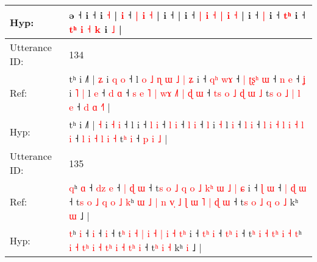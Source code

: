 \documentclass[10pt]{article}
\DeclareRobustCommand{\hl}[1]{{\textcolor{red}{#1}}}
\begin{document}
\begin{longtable}{ll}
Hyp: & ə ˧\hl{}\hl{} i ˧\hl{}\hl{}\hl{}\hl{}\hl{}\hl{}\hl{}\hl{} i\hl{}\hl{}\hl{}\hl{}\hl{}\hl{}\hl{} \hl{˧} |\hl{}\hl{} \hl{}\hl{i} ˧\hl{}\hl{}\hl{}\hl{}\hl{}\hl{}\hl{}\hl{}\hl{}\hl{}\hl{}\hl{}\hl{} \hl{}\hl{|} \hl{i} \hl{˧} |\hl{}\hl{} i ˧ |\hl{}\hl{} i ˧ \hl{|} \hl{}\hl{i} \hl{˧} \hl{|} \hl{i} \hl{˧} |\hl{}\hl{} i ˧ \hl{|} i ˧ \hl{}\hl{t}\hl{ʰ} i ˧ \hl{}\hl{t}\hl{ʰ} \hl{i} \hl{˧} \hl{k} i \hl{˩} |
 \\
\midrule
Utterance ID: & 134 \\
Ref: & tʰ i ˩˥ | \hl{ʑ} i \hl{q} \hl{o} ˧ l\hl{ }\hl{o}\hl{ }\hl{˩}\hl{ }\hl{ɳ}\hl{ }\hl{ɯ}\hl{ }\hl{˩}\hl{ }\hl{|}\hl{ }\hl{ʑ} i ˧ \hl{q}\hl{ʰ} \hl{w}\hl{ɤ} ˧\hl{ }\hl{|} \hl{ʈ}\hl{ʂ}\hl{ʰ} \hl{ɯ} ˧ \hl{n} \hl{e} ˧ \hl{ʝ} i\hl{ }\hl{˥} \hl{|} l \hl{e} ˧ \hl{d} \hl{ɑ} ˧\hl{ }\hl{s} \hl{e} \hl{˥} \hl{|} \hl{w}\hl{ɤ} \hl{˩}\hl{˥} \hl{|} \hl{ɖ} \hl{ɯ} ˧ \hl{t}\hl{s} \hl{o} \hl{˩} \hl{ɖ} \hl{ɯ} \hl{˩} t\hl{s}\hl{ }\hl{o}\hl{ }\hl{˩}\hl{ }\hl{|}\hl{ }\hl{l} \hl{e} ˧ \hl{d} \hl{ɑ} \hl{˧}\hl{˥} |
 \\
Hyp: & tʰ i ˩˥ | \hl{˧} i \hl{˧} \hl{i} ˧ l\hl{}\hl{}\hl{}\hl{}\hl{}\hl{}\hl{}\hl{}\hl{}\hl{}\hl{}\hl{}\hl{}\hl{} i ˧ \hl{}\hl{l} \hl{}\hl{i} ˧\hl{}\hl{} \hl{}\hl{}\hl{l} \hl{i} ˧ \hl{l} \hl{i} ˧ \hl{l} i\hl{}\hl{} \hl{˧} l \hl{i} ˧ \hl{l} \hl{i} ˧\hl{}\hl{} \hl{l} \hl{i} \hl{˧} \hl{}\hl{l} \hl{}\hl{i} \hl{˧} \hl{l} \hl{i} ˧ \hl{}\hl{l} \hl{i} \hl{˧} \hl{l} \hl{i} \hl{˧} t\hl{}\hl{}\hl{}\hl{}\hl{}\hl{}\hl{}\hl{}\hl{ʰ} \hl{i} ˧ \hl{p} \hl{i} \hl{}\hl{˩} |
 \\
\midrule
Utterance ID: & 135 \\
Ref: & \hl{q}ʰ \hl{ɑ} ˧\hl{ }\hl{d}\hl{z} \hl{e} ˧\hl{ }\hl{|}\hl{ }\hl{ɖ} \hl{ɯ} ˧ t\hl{s} \hl{o} \hl{˩} \hl{q} \hl{o} \hl{˩} \hl{k}\hl{ʰ} \hl{ɯ} \hl{˩} \hl{|}\hl{ }\hl{ɕ} i ˧ \hl{}\hl{ɭ} \hl{ɯ} ˧ \hl{|}\hl{ }\hl{ɖ} \hl{ɯ} ˧ t\hl{s} \hl{o} \hl{˩} \hl{}\hl{q} \hl{o} \hl{˩} \hl{k}ʰ \hl{ɯ} \hl{˩} \hl{}\hl{|} \hl{n} \hl{v}\hl{̩} \hl{˩}\hl{ }\hl{ɭ} \hl{ɯ} \hl{˥} \hl{|}\hl{ }\hl{ɖ} \hl{ɯ} ˧ t\hl{s}\hl{ }\hl{o}\hl{ }\hl{˩}\hl{ }\hl{q} \hl{o} \hl{˩} kʰ \hl{ɯ} ˩ |
 \\
Hyp: & \hl{t}ʰ \hl{i} ˧\hl{}\hl{}\hl{} \hl{i} ˧\hl{}\hl{}\hl{}\hl{} \hl{i} ˧ t\hl{ʰ} \hl{i} \hl{˧} \hl{|} \hl{i} \hl{˧} \hl{}\hl{|} \hl{i} \hl{˧} \hl{}\hl{t}\hl{ʰ} i ˧ \hl{t}\hl{ʰ} \hl{i} ˧ \hl{}\hl{t}\hl{ʰ} \hl{i} ˧ t\hl{ʰ} \hl{i} \hl{˧} \hl{t}\hl{ʰ} \hl{i} \hl{˧} \hl{t}ʰ \hl{i} \hl{˧} \hl{t}\hl{ʰ} \hl{i} \hl{}\hl{˧} \hl{}\hl{t}\hl{ʰ} \hl{i} \hl{˧} \hl{}\hl{t}\hl{ʰ} \hl{i} ˧ t\hl{}\hl{}\hl{}\hl{}\hl{}\hl{}\hl{ʰ} \hl{i} \hl{˧} kʰ \hl{i} ˩ |
 \\

\end{longtable}
\end{document}
